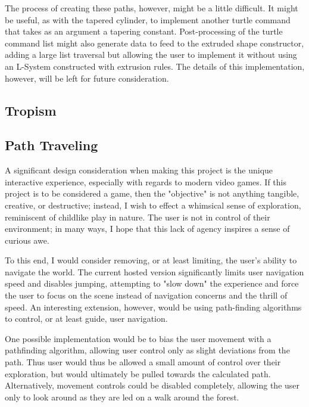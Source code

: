 \documentclass{article}
\newcommand{\tab}{\hspace*{2em}}
\begin{document}
    \tab The process of creating these paths, however, might be a little difficult. It might be
useful, as with the tapered cylinder, to implement another turtle command that takes as an argument
a tapering constant. Post-processing of the turtle command list might also generate data to feed to
the extruded shape constructor, adding a large list traversal but allowing the user to implement it
without using an L-System constructed with extrusion rules. The details of this implementation,
however, will be left for future consideration.

        \subsection{Tropism}

        \subsection{Path Traveling}
    \tab A significant design consideration when making this project is the unique interactive
experience, especially with regards to modern video games. If this project is to be considered a
game, then the "objective" is not anything tangible, creative, or destructive; instead, I wish to
effect a whimsical sense of exploration, reminiscent of childlike play in nature. The user is not
in control of their environment; in many ways, I hope that this lack of agency inspires a sense of
curious awe.

    \tab To this end, I would consider removing, or at least limiting, the user's ability to
navigate the world. The current hosted version significantly limits user navigation speed and
disables jumping, attempting to "slow down" the experience and force the user to focus on the scene
instead of navigation concerns and the thrill of speed. An interesting extension, however, would be
using path-finding algorithms to control, or at least guide, user navigation. 

    \tab One possible implementation would be to bias the user movement with a pathfinding
algorithm, allowing user control only as slight deviations from the path. Thus user would thus be
allowed a small amount of control over their exploration, but would ultimately be pulled towards
the calculated path. Alternatively, movement controls could be disabled completely, allowing the
user only to look around as they are led on a walk around the forest.
\end{document}
